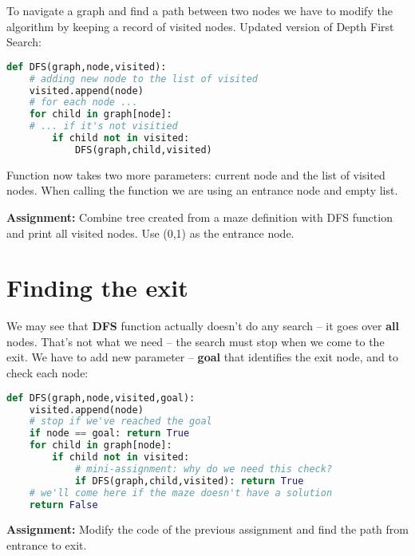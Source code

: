 To navigate a graph and find a path between two nodes we
have to modify the algorithm by keeping a record of visited
nodes. Updated version of Depth First Search:

\begin{lstlisting}[language=Python,style=codelst2,caption={Python: DFS with saving visited nodes}]
def DFS(graph,node,visited):
    # adding new node to the list of visited
    visited.append(node)
    # for each node ...
    for child in graph[node]:
    # ... if it's not visitied
        if child not in visited:
            DFS(graph,child,visited)
\end{lstlisting}

Function now takes two more parameters: current node and the list
of visited nodes. When calling the function we are using
an entrance node and empty list.

\begin{tcolorbox}
\textbf{Assignment:}
Combine tree created from a maze definition with DFS function and
print all visited nodes. Use (0,1) as the entrance node.
\end{tcolorbox}

\section{Finding the exit}

We may see that \textbf{DFS} function actually doesn't do any search --
it goes over \textbf{all} nodes. That's not what we need -- the search must
stop when we come to the exit. We have to add new parameter -- \textbf{goal}
that identifies the exit node, and to check each node:

\begin{lstlisting}[language=Python,style=codelst2,caption={Python: DFS with checking the goal}]
def DFS(graph,node,visited,goal):
    visited.append(node)
    # stop if we've reached the goal
    if node == goal: return True
    for child in graph[node]:
        if child not in visited:
            # mini-assignment: why do we need this check?
            if DFS(graph,child,visited): return True
    # we'll come here if the maze doesn't have a solution
    return False
\end{lstlisting}


\begin{tcolorbox}
\textbf{Assignment:}
Modify the code of the previous assignment and find the path from
entrance to exit.
\end{tcolorbox}


